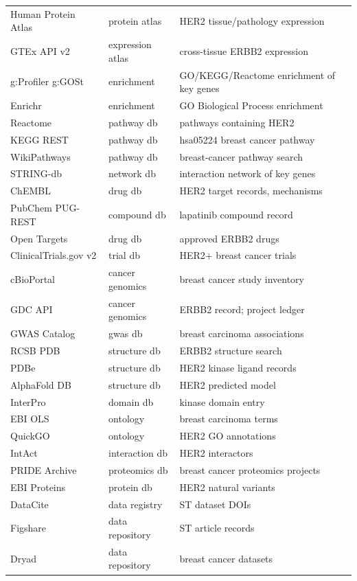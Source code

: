 \documentclass[11pt]{article}
\begin{document}
\begin{longtable}{p{4.2cm}p{2.6cm}p{8.2cm}}
Human Protein Atlas & protein atlas & HER2 tissue/pathology expression \\
GTEx API v2 & expression atlas & cross-tissue ERBB2 expression \\
g:Profiler g:GOSt & enrichment & GO/KEGG/Reactome enrichment of key genes \\
Enrichr & enrichment & GO Biological Process enrichment \\
Reactome & pathway db & pathways containing HER2 \\
KEGG REST & pathway db & hsa05224 breast cancer pathway \\
WikiPathways & pathway db & breast-cancer pathway search \\
STRING-db & network db & interaction network of key genes \\
ChEMBL & drug db & HER2 target records, mechanisms \\
PubChem PUG-REST & compound db & lapatinib compound record \\
Open Targets & drug db & approved ERBB2 drugs \\
ClinicalTrials.gov v2 & trial db & HER2+ breast cancer trials \\
cBioPortal & cancer genomics & breast cancer study inventory \\
GDC API & cancer genomics & ERBB2 record; project ledger \\
GWAS Catalog & gwas db & breast carcinoma associations \\
RCSB PDB & structure db & ERBB2 structure search \\
PDBe & structure db & HER2 kinase ligand records \\
AlphaFold DB & structure db & HER2 predicted model \\
InterPro & domain db & kinase domain entry \\
EBI OLS & ontology & breast carcinoma terms \\
QuickGO & ontology & HER2 GO annotations \\
IntAct & interaction db & HER2 interactors \\
PRIDE Archive & proteomics db & breast cancer proteomics projects \\
EBI Proteins & protein db & HER2 natural variants \\
DataCite & data registry & ST dataset DOIs \\
Figshare & data repository & ST article records \\
Dryad & data repository & breast cancer datasets \\

\end{longtable}
\end{document}
